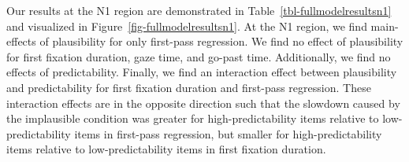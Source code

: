 \documentclass[
  12pt,
  letterpaper,
]{scrreport}
\begin{document}
Our results at the N1 region are demonstrated in
Table~\ref{tbl-fullmodelresultsn1} and visualized in
Figure~\ref{fig-fullmodelresultsn1}. At the N1 region, we find
main-effects of plausibility for only first-pass regression. We find no
effect of plausibility for first fixation duration, gaze time, and
go-past time. Additionally, we find no effects of predictability.
Finally, we find an interaction effect between plausibility and
predictability for first fixation duration and first-pass regression.
These interaction effects are in the opposite direction such that the
slowdown caused by the implausible condition was greater for
high-predictability items relative to low-predictability items in
first-pass regression, but smaller for high-predictability items
relative to low-predictability items in first fixation duration.
\end{document}
